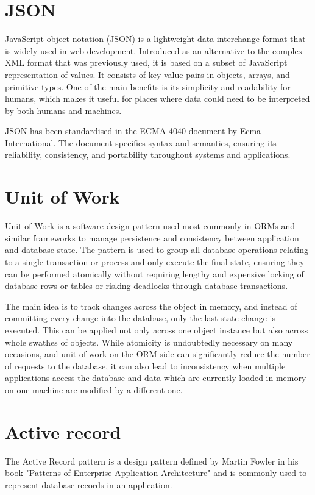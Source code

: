 \section{JSON}
JavaScript object notation (JSON) is a lightweight data-interchange format that
is widely used in web development. Introduced as an alternative to the complex
XML format that was previously used, it is based on a subset of JavaScript
representation of values. It consists of key-value pairs in objects, arrays, and
primitive types. One of the main benefits is its simplicity and readability for
humans, which makes it useful for places where data could need to be interpreted
by both humans and machines.

JSON has been standardised in the ECMA-4040 document by Ecma International. The
document specifies syntax and semantics, ensuring its reliability, consistency,
and portability throughout systems and applications.


\section{Unit of Work}
Unit of Work is a software design pattern used most commonly in ORMs and similar
frameworks to manage persistence and consistency between application and
database state. The pattern is used to group all database operations relating to
a single transaction or process and only execute the final state, ensuring they
can be performed atomically without requiring lengthy and expensive locking of
database rows or tables or risking deadlocks through database transactions.

The main idea is to track changes across the object in memory, and instead of
committing every change into the database, only the last state change is
executed. This can be applied not only across one object instance but also
across whole swathes of objects. While atomicity is undoubtedly necessary on
many occasions, and unit of work on the ORM side can significantly reduce the
number of requests to the database, it can also lead to inconsistency when
multiple applications access the database and data which are currently loaded in
memory on one machine are modified by a different one.


\section{Active record}
The Active Record pattern is a design pattern defined by Martin Fowler in his
book "Patterns of Enterprise Application Architecture" and is commonly used to
represent database records in an application.

